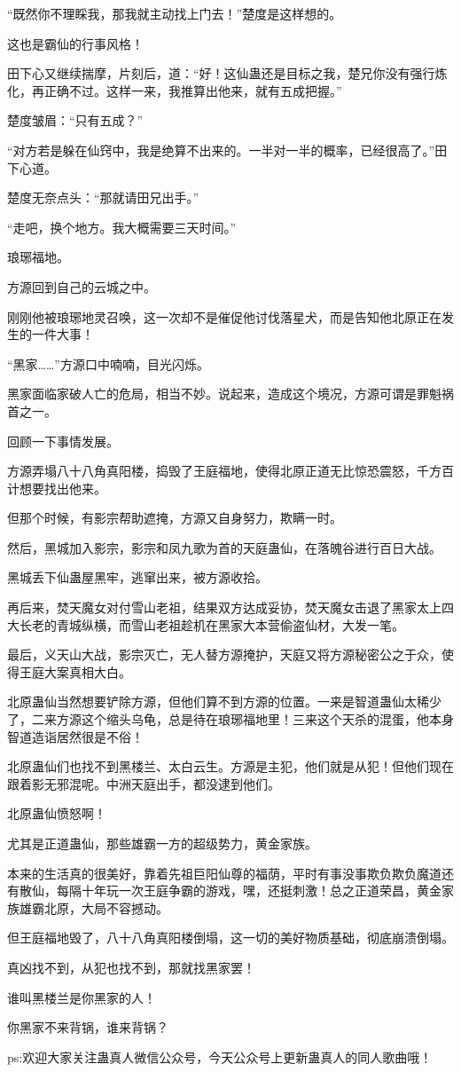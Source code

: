 \begin{this_body}
“既然你不理睬我，那我就主动找上门去！”楚度是这样想的。

这也是霸仙的行事风格！

田下心又继续揣摩，片刻后，道：“好！这仙蛊还是目标之我，楚兄你没有强行炼化，再正确不过。这样一来，我推算出他来，就有五成把握。”

楚度皱眉：“只有五成？”

“对方若是躲在仙窍中，我是绝算不出来的。一半对一半的概率，已经很高了。”田下心道。

楚度无奈点头：“那就请田兄出手。”

“走吧，换个地方。我大概需要三天时间。”

琅琊福地。

方源回到自己的云城之中。

刚刚他被琅琊地灵召唤，这一次却不是催促他讨伐落星犬，而是告知他北原正在发生的一件大事！

“黑家……”方源口中喃喃，目光闪烁。

黑家面临家破人亡的危局，相当不妙。说起来，造成这个境况，方源可谓是罪魁祸首之一。

回顾一下事情发展。

方源弄塌八十八角真阳楼，捣毁了王庭福地，使得北原正道无比惊恐震怒，千方百计想要找出他来。

但那个时候，有影宗帮助遮掩，方源又自身努力，欺瞒一时。

然后，黑城加入影宗，影宗和凤九歌为首的天庭蛊仙，在落魄谷进行百日大战。

黑城丢下仙蛊屋黑牢，逃窜出来，被方源收拾。

再后来，焚天魔女对付雪山老祖，结果双方达成妥协，焚天魔女击退了黑家太上四大长老的青城纵横，而雪山老祖趁机在黑家大本营偷盗仙材，大发一笔。

最后，义天山大战，影宗灭亡，无人替方源掩护，天庭又将方源秘密公之于众，使得王庭大案真相大白。

北原蛊仙当然想要铲除方源，但他们算不到方源的位置。一来是智道蛊仙太稀少了，二来方源这个缩头乌龟，总是待在琅琊福地里！三来这个天杀的混蛋，他本身智道造诣居然很是不俗！

北原蛊仙们也找不到黑楼兰、太白云生。方源是主犯，他们就是从犯！但他们现在跟着影无邪混呢。中洲天庭出手，都没逮到他们。

北原蛊仙愤怒啊！

尤其是正道蛊仙，那些雄霸一方的超级势力，黄金家族。

本来的生活真的很美好，靠着先祖巨阳仙尊的福荫，平时有事没事欺负欺负魔道还有散仙，每隔十年玩一次王庭争霸的游戏，嘿，还挺刺激！总之正道荣昌，黄金家族雄霸北原，大局不容撼动。

但王庭福地毁了，八十八角真阳楼倒塌，这一切的美好物质基础，彻底崩溃倒塌。

真凶找不到，从犯也找不到，那就找黑家罢！

谁叫黑楼兰是你黑家的人！

你黑家不来背锅，谁来背锅？

ps:欢迎大家关注蛊真人微信公众号，今天公众号上更新蛊真人的同人歌曲哦！

\end{this_body}

